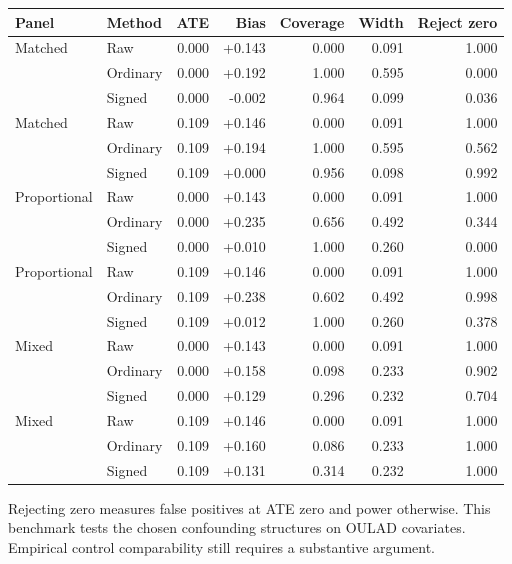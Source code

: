 \begin{center}\footnotesize
\begin{tabular}{llrrrrr}\toprule
Panel & Method & ATE & Bias & Coverage & Width & Reject zero \\\midrule
Matched & Raw & 0.000 & +0.143 & 0.000 & 0.091 & 1.000 \\
 & Ordinary & 0.000 & +0.192 & 1.000 & 0.595 & 0.000 \\
 & Signed & 0.000 & -0.002 & 0.964 & 0.099 & 0.036 \\
Matched & Raw & 0.109 & +0.146 & 0.000 & 0.091 & 1.000 \\
 & Ordinary & 0.109 & +0.194 & 1.000 & 0.595 & 0.562 \\
 & Signed & 0.109 & +0.000 & 0.956 & 0.098 & 0.992 \\
Proportional & Raw & 0.000 & +0.143 & 0.000 & 0.091 & 1.000 \\
 & Ordinary & 0.000 & +0.235 & 0.656 & 0.492 & 0.344 \\
 & Signed & 0.000 & +0.010 & 1.000 & 0.260 & 0.000 \\
Proportional & Raw & 0.109 & +0.146 & 0.000 & 0.091 & 1.000 \\
 & Ordinary & 0.109 & +0.238 & 0.602 & 0.492 & 0.998 \\
 & Signed & 0.109 & +0.012 & 1.000 & 0.260 & 0.378 \\
Mixed & Raw & 0.000 & +0.143 & 0.000 & 0.091 & 1.000 \\
 & Ordinary & 0.000 & +0.158 & 0.098 & 0.233 & 0.902 \\
 & Signed & 0.000 & +0.129 & 0.296 & 0.232 & 0.704 \\
Mixed & Raw & 0.109 & +0.146 & 0.000 & 0.091 & 1.000 \\
 & Ordinary & 0.109 & +0.160 & 0.086 & 0.233 & 1.000 \\
 & Signed & 0.109 & +0.131 & 0.314 & 0.232 & 1.000 \\
\bottomrule\end{tabular}
\end{center}
Rejecting zero measures false positives at ATE zero and power otherwise. This benchmark tests the chosen confounding structures on OULAD covariates. Empirical control comparability still requires a substantive argument.
